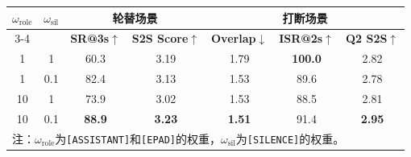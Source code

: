 \begin{table}[!htbp]
    \label{tab:fullduplex_weight}
    \centering
    \small
    \begin{tabular}{ccccccc}
        \toprule
        \multirow{2}{*}{$\omega_{\text{role}}$} & \multirow{2}{*}{$\omega_{\text{sil}}$} & \multicolumn{2}{c}{\textbf{轮替场景}} & \multicolumn{3}{c}{\textbf{打断场景}} \\
        \cmidrule{3-4} \cmidrule{5-7}
        & & \textbf{SR@3s$\uparrow$} & \textbf{S2S Score$\uparrow$} & \textbf{Overlap$\downarrow$} & \textbf{ISR@2s$\uparrow$} & \textbf{Q2 S2S$\uparrow$} \\
        \midrule
        1 & 1 & 60.3 & 3.19 & 1.79 & \textbf{100.0} & 2.82 \\
        1 & 0.1 & 82.4 & 3.13 & 1.53 & 89.6 & 2.78 \\
        10 & 1 & 73.9 & 3.02 & 1.53 & 88.5 & 2.81 \\
        10 & 0.1 & \textbf{88.9} & \textbf{3.23} & \textbf{1.51} & 91.4 & \textbf{2.95} \\
        \bottomrule
        \multicolumn{7}{l}{\scriptsize 注：$\omega_{\text{role}}$为\texttt{[ASSISTANT]}和\texttt{[EPAD]}的权重，$\omega_{\text{sil}}$为\texttt{[SILENCE]}的权重。}
    \end{tabular}
\end{table}

